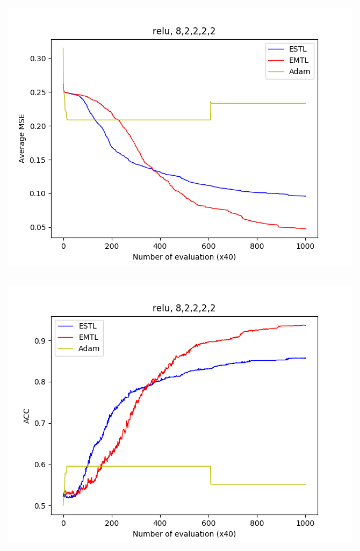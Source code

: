 \documentclass[conference]{IEEEtran}
\theoremstyle{definition}
\begin{document}
\begin{figure}
      \begin{subfigure}{0.48\linewidth}
        \centering
        \includegraphics[width=1.0\linewidth]{images/relu/avg_mse8,2,2,2,2.png}
      \end{subfigure}
      \begin{subfigure}{0.48\linewidth}
        \centering
        \includegraphics[width=1.0\linewidth]{images/relu/avg_acc8,2,2,2,2.png}
      \end{subfigure}


\end{figure}
\end{document}
